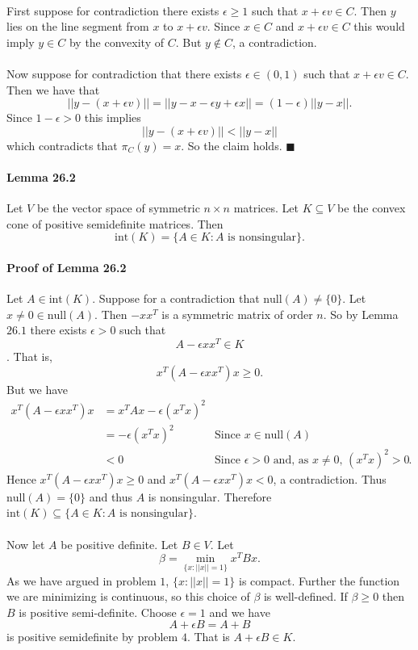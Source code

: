 \documentclass[letterpaper,12pt,oneside,onecolumn]{article}
\begin{document}
\paragraph{}
First suppose for contradiction there exists $\epsilon \geq 1$ such that $x + \epsilon v \in C$. Then $y$ lies on the line segment from $x$ to $x + \epsilon v$. Since $x \in C$ and $x +\epsilon v \in C$ this would imply $y \in C$ by the convexity of $C$. But $y \not\in C$, a contradiction.
\paragraph{}
Now suppose for contradiction that there exists $\epsilon \in (0,1)$ such that $x + \epsilon v \in C$. Then we have that
$$ ||y - (x + \epsilon v)|| = ||y - x - \epsilon y + \epsilon x|| = (1-\epsilon) ||y-x||.$$
Since $1-\epsilon > 0$ this implies
$$||y - (x + \epsilon v)|| < ||y -x|| $$
which contradicts that $\pi_C(y) = x$. So the claim holds. $\blacksquare$
\paragraph{Lemma 26.2}
Let $V$ be the vector space of symmetric $n\times n$ matrices. Let $K\subseteq V$ be the convex cone of positive semidefinite matrices. Then $$\text{int}(K) =\{A \in K : A\text{ is nonsingular}\}.$$
\paragraph{Proof of Lemma 26.2}
Let $A \in \text{int}(K)$. Suppose for a contradiction that $\text{null}(A) \neq \{0\}$. Let $x \neq 0 \in \text{null}(A)$. Then $-xx^T$ is a symmetric matrix of order $n$. So by Lemma $26.1$ there exists $\epsilon > 0$ such that $$A - \epsilon xx^T \in K$$. That is,
$$x^T(A - \epsilon xx^T)x \geq 0.$$
But we have
\begin{align*}
x^T(A - \epsilon xx^T)x &= x^TAx - \epsilon (x^Tx)^2  \\
&= -\epsilon (x^Tx)^2  &\text{Since $x\in\text{null}(A)$} \\
&< 0 &\text{Since $\epsilon > 0$ and, as $x \neq 0$, $(x^Tx)^2 > 0$}. 
\end{align*}
Hence $x^T(A - \epsilon xx^T)x \geq 0$ and $x^T(A - \epsilon xx^T)x  < 0$, a contradiction. Thus $\text{null}(A) = \{0\}$ and thus $A$ is nonsingular. Therefore $\text{int}(K) \subseteq \{A \in K : A \text{ is nonsingular}\}$.
\paragraph{}
Now let $A$ be positive definite. Let $B \in V$. Let
$$ \beta = \min_{\{x : ||x|| = 1\}} x^T B x.$$
As we have argued in problem $1$, $\{x : ||x||=1\}$ is compact. Further the function we are minimizing is continuous, so this choice of $\beta$ is well-defined. If $\beta \geq 0$ then $B$ is positive semi-definite. Choose $\epsilon = 1$ and we have
$$A + \epsilon B = A + B$$
is positive semidefinite by problem $4$. That is $A +\epsilon B \in K$.
\end{document}
